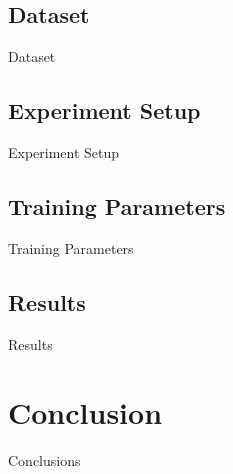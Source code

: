 \subsection{Dataset}
Dataset

\subsection{Experiment Setup}
Experiment Setup

\subsection{Training Parameters}
Training Parameters

\subsection{Results}
Results



\section{Conclusion}
Conclusions